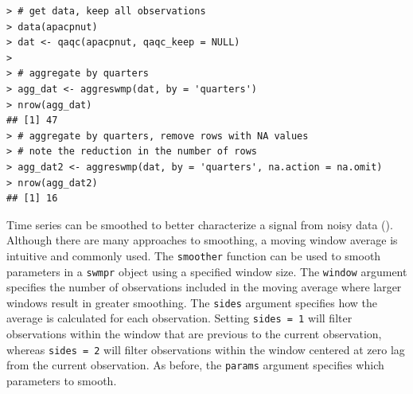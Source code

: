 \documentclass[10pt,letterpaper]{article}\usepackage[]{graphicx}\usepackage[]{color}
\makeatletter
\newenvironment{kframe}{%
 \def\at@end@of@kframe{}%
 \ifinner\ifhmode%
  \def\at@end@of@kframe{\end{minipage}}%
  \begin{minipage}{\columnwidth}%
 \fi\fi%
 \def\FrameCommand##1{\hskip\@totalleftmargin \hskip-\fboxsep
 \colorbox{shadecolor}{##1}\hskip-\fboxsep
     \hskip-\linewidth \hskip-\@totalleftmargin \hskip\columnwidth}%
 \MakeFramed {\advance\hsize-\width
   \@totalleftmargin\z@ \linewidth\hsize
   \@setminipage}}%
 {\par\unskip\endMakeFramed%
 \at@end@of@kframe}
\newenvironment{knitrout}{}{} %
\makeatother
\begin{document}
\begin{table}[!tbp]
\end{table}


\begin{knitrout}\small
{}\color{fgcolor}\begin{kframe}
\begin{verbatim}
> # get data, keep all observations
> data(apacpnut)
> dat <- qaqc(apacpnut, qaqc_keep = NULL)
> 
> # aggregate by quarters
> agg_dat <- aggreswmp(dat, by = 'quarters')
> nrow(agg_dat)
## [1] 47
> # aggregate by quarters, remove rows with NA values
> # note the reduction in the number of rows
> agg_dat2 <- aggreswmp(dat, by = 'quarters', na.action = na.omit)
> nrow(agg_dat2)
## [1] 16
\end{verbatim}
\end{kframe}
\end{knitrout}

Time series can be smoothed to better characterize a signal from noisy data ().  Although there are many approaches to smoothing, a moving window average is intuitive and commonly used.  The \texttt{smoother} function can be used to smooth parameters in a \texttt{swmpr} object using a specified window size.  The \texttt{window} argument specifies the number of observations included in the moving average where larger windows result in greater smoothing.  The \texttt{sides} argument specifies how the average is calculated for each observation.  Setting \texttt{sides = 1} will filter observations within the window that are previous to the current observation, whereas \texttt{sides = 2} will filter observations within the window centered at zero lag from the current observation. As before, the \texttt{params} argument specifies which parameters to smooth.
\end{document}
